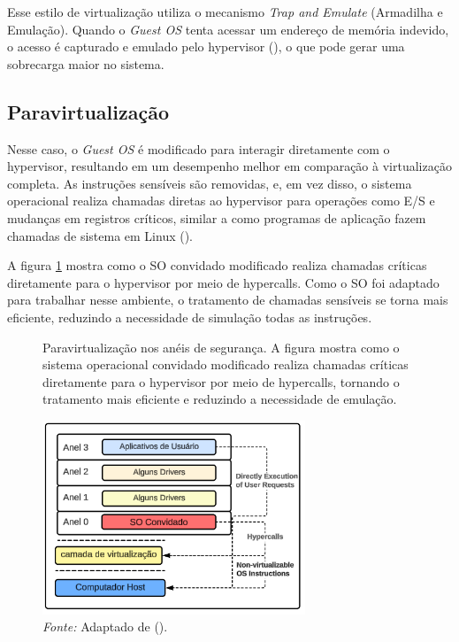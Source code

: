 Esse estilo de virtualização utiliza o mecanismo \textit{Trap and Emulate} (Armadilha e Emulação). Quando o \textit{Guest OS} tenta acessar um endereço de memória indevido, o acesso é capturado e emulado pelo hypervisor (\cite{chirammal2016mastering}), o que pode gerar uma sobrecarga maior no sistema.

\subsection{Paravirtualização}

Nesse caso, o \textit{Guest OS} é modificado para interagir diretamente com o hypervisor, resultando em um desempenho melhor em comparação à virtualização completa. As instruções sensíveis são removidas, e, em vez disso, o sistema operacional realiza chamadas diretas ao hypervisor para operações como E/S e mudanças em registros críticos, similar a como programas de aplicação fazem chamadas de sistema em Linux (\cite{modernOS}).

A figura \ref{fig:paravirtualization_rings} mostra como o SO convidado modificado realiza chamadas críticas diretamente para o hypervisor por meio de hypercalls. Como o SO foi adaptado para trabalhar nesse ambiente, o tratamento de chamadas sensíveis se torna mais eficiente, reduzindo a necessidade de simulação todas as instruções.

\begin{figure}[htbp]
  \centering
  \caption{Paravirtualização nos anéis de segurança. A figura mostra como o sistema operacional convidado modificado realiza chamadas críticas diretamente para o hypervisor por meio de hypercalls, tornando o tratamento mais eficiente e reduzindo a necessidade de emulação.}
  \includegraphics[width=0.7\textwidth]{images/paravirtualization_rings.png}
  \caption*{\textit{Fonte:} Adaptado de (\cite{chirammal2016mastering}).}
  \label{fig:paravirtualization_rings}
\end{figure}

